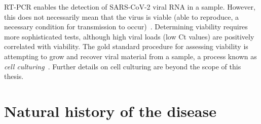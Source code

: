 \documentclass[thesis.tex]{subfiles}
\begin{document}
RT-PCR enables the detection of SARS-CoV-2 viral RNA in a sample.
However, this does not necessarily mean that the virus is viable (\ie able to reproduce, a necessary condition for transmission to occur)~\autocite{puhachSARSCoV2}.
Determining viability requires more sophisticated tests, although high viral loads (low Ct values) are positively correlated with viability.
The gold standard procedure for assessing viability is attempting to grow and recover viral material from a sample, a process known as \emph{cell culturing}~\autocite{singanayagamDuration,puhachSARSCoV2,hakkiOnset}.
Further details on cell culturing are beyond the scope of this thesis.

\section{Natural history of the disease} \label{biology-data:sec:natural-history}
\end{document}
